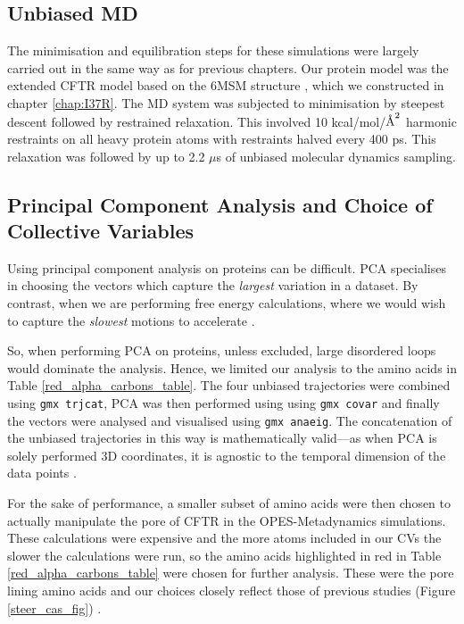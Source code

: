 \subsection{Unbiased MD }
The minimisation and equilibration steps for these simulations were largely carried out in the same way as for previous chapters. Our protein model was the extended CFTR model based on the 6MSM structure \cite{zhang2018}, which we constructed in chapter \ref{chap:I37R}. The MD system was subjected to minimisation by steepest descent followed by restrained relaxation. This involved 10 kcal/mol/$\textup{\AA}^2$ harmonic restraints on all heavy protein atoms with restraints halved every 400 ps. This relaxation was followed by up to 2.2 $\mu$s of unbiased molecular dynamics sampling.

\subsection {Principal Component Analysis and Choice of Collective Variables}
\label {supp_cv_choice}
Using principal component analysis on proteins can be difficult. PCA specialises in choosing the vectors which capture the \textit{largest} variation in a dataset. By contrast, when we are performing free energy calculations, where we would wish to capture the \textit{slowest} motions to accelerate \cite{noe2001}. 

So, when performing PCA on proteins, unless excluded, large disordered loops would dominate the analysis. Hence, we limited our analysis to the amino acids in Table \ref{red_alpha_carbons_table}. The four unbiased trajectories were combined using \verb_gmx trjcat_, PCA was then performed using using \verb_gmx covar_ and finally the vectors were analysed and visualised using \verb_gmx anaeig_. The concatenation of the unbiased trajectories in this way is mathematically valid---as when PCA is solely performed 3D coordinates, it is agnostic to the temporal dimension of the data points \cite{grus2015}.

For the sake of performance, a smaller subset of amino acids were then chosen to actually manipulate the pore of CFTR in the OPES-Metadynamics simulations. These calculations were expensive and the more atoms included in our CVs the slower the calculations were run, so the amino acids highlighted in red in Table \ref{red_alpha_carbons_table} were chosen for further analysis. These were the pore lining amino acids and our choices closely reflect those of previous studies (Figure \ref{steer_cas_fig}) \cite{hoffmann2018}. 


